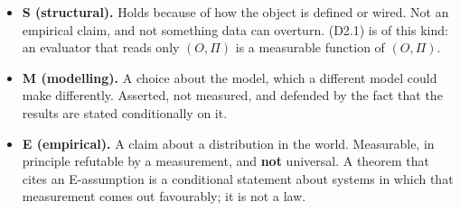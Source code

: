 \documentclass[11pt,a4paper]{article}
\providecommand{\tightlist}{\setlength{\itemsep}{0pt}\setlength{\parskip}{0pt}}
\begin{document}
\begin{itemize}
\tightlist
\item
  \textbf{S (structural).} Holds because of how the object is defined or wired. Not an
  empirical claim, and not something data can overturn. (D2.1) is of this kind: an
  evaluator that reads only \((O,\Pi)\) is a measurable function of \((O,\Pi)\).
\item
  \textbf{M (modelling).} A choice about the model, which a different model could make
  differently. Asserted, not measured, and defended by the fact that the results
  are stated conditionally on it.
\item
  \textbf{E (empirical).} A claim about a distribution in the world. Measurable, in
  principle refutable by a measurement, and \textbf{not} universal. A theorem that cites
  an E-assumption is a conditional statement about systems in which that
  measurement comes out favourably; it is not a law.
\end{itemize}
\end{document}
